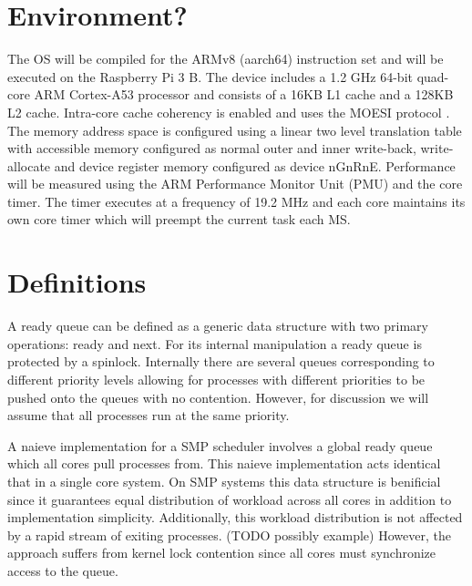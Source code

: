 \documentclass{cys}
\begin{document}
\section{Environment?}
\label{sec:environment?}
The OS will be compiled for the ARMv8 (aarch64) instruction set and will be executed on the Raspberry Pi 3 B.  The device includes a 1.2 GHz 64-bit quad-core ARM Cortex-A53 processor and consists of a 16KB L1 cache and a 128KB L2 cache.  Intra-core cache coherency is enabled and uses the MOESI protocol \cite{https://developer.arm.com/docs/ddi0500/e/level-1-memory-system/cache-behavior/data-cache-coherency}.  The memory address space is configured using a linear two level translation table with accessible memory configured as normal outer and inner write-back, write-allocate and device register memory configured as device nGnRnE.  Performance will be measured using the ARM Performance Monitor Unit (PMU) and the core timer.  The timer executes at a frequency of 19.2 MHz and each core maintains its own core timer which will preempt the current task each MS. \cite{https://www.raspberrypi.org/documentation/hardware/raspberrypi/bcm2836/QA7_rev3.4.pdf}

\section{Definitions}
\label{sec:definitions}

A ready queue can be defined as a generic data structure with two primary operations: ready and next.  For its internal manipulation a ready queue is protected by a spinlock.  Internally there are several queues corresponding to different priority levels allowing for processes with different priorities to be pushed onto the queues with no contention.  However, for discussion we will assume that all processes run at the same priority.

A naieve implementation for a SMP scheduler involves a global ready queue which all cores pull processes from.  This naieve implementation acts identical that in a single core system.  On SMP systems this data structure is benificial since it guarantees equal distribution of workload across all cores in addition to implementation simplicity.  Additionally, this workload distribution is not affected by a rapid stream of exiting processes. (TODO possibly example)  However, the approach suffers from kernel lock contention since all cores must synchronize access to the queue.
\end{document}
